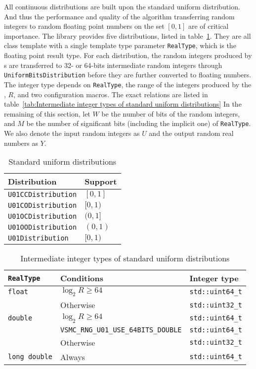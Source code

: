 All continuous distributions are built upon the standard uniform distribution.
And thus the performance and quality of the algorithm transferring random
integers to random floating point numbers on the set $[0, 1]$ are of critical
importance. The library provides five distributions, listed in
table~\ref{tab:Standard uniform distributions}. They are all class template
with a single template type parameter \verb|RealType|, which is the floating
point result type. For each distribution, the random integers produced by
\rng{}s are transferred to 32- or 64-bits intermediate random integers through
\verb|UniformBitsDistribution| before they are further converted to floating
numbers. The integer type depends on \verb|RealType|, the range of the integers
produced by the \rng{}, $R$, and two configuration macros. The exact relations
are listed in table~\ref{tab:Intermediate integer types of standard uniform
  distributions} In the remaining of this section, let $W$ be the number of
bits of the random integers, and $M$ be the number of significant bits
(including the implicit one) of \verb|RealType|. We also denote the input
random integers as $U$ and the output random real numbers as $Y$.

\begin{table}
  \begin{tabularx}{\textwidth}{XX}
    \toprule
    Distribution & Support \\
    \midrule
    \verb|U01CCDistribution| & $[0, 1]$ \\
    \verb|U01CODistribution| & $[0, 1)$ \\
    \verb|U01OCDistribution| & $(0, 1]$ \\
    \verb|U01OODistribution| & $(0, 1)$ \\
    \verb|U01Distribution|   & $[0, 1)$ \\
    \bottomrule
  \end{tabularx}
  \caption{Standard uniform distributions}
  \label{tab:Standard uniform distributions}
\end{table}

\begin{table}
  \begin{tabularx}{\textwidth}{XlX}
    \toprule
    \verb|RealType| & Conditions & Integer type \\
    \midrule
    \verb|float| & $\log_2 R \ge 64$ & \verb|std::uint64_t| \\
                 & Otherwise         & \verb|std::uint32_t| \\
    \verb|double| & $\log_2 R \ge 64$ & \verb|std::uint64_t| \\
    & \verb|VSMC_RNG_U01_USE_64BITS_DOUBLE| & \verb|std::uint64_t| \\
    & Otherwise & \verb|std::uint32_t| \\
    \verb|long double| & Always & \verb|std::uint64_t| \\
    \bottomrule
  \end{tabularx}
  \caption{Intermediate integer types of standard uniform distributions}
  \label{tab:Intermediate integer types of standard uniform distributions}
\end{table}

